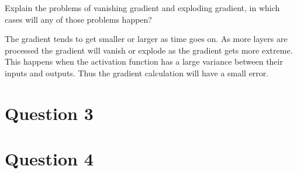 \documentclass{article}
\begin{document}
Explain the problems of vanishing gradient and exploding gradient, in which cases will any of those problems happen?

The gradient tends to get smaller or larger as time goes on. As more layers are processed the gradient will vanish or explode as the gradient gets more extreme. This happens when the activation function has a large variance between their inputs and outputs. Thus the gradient calculation will have a small error. 






\section{Question 3}




\section{Question 4}
\end{document}

